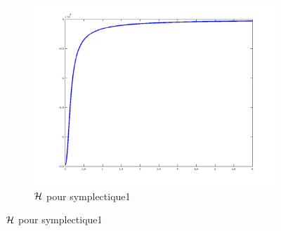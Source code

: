 \begin{figure}
\begin{subfigure}[b]{0.3\textwidth}
    \includegraphics[width=\textwidth]{images/Q2_symplectique1_H.png}
    \caption{$\mathcal{H}$ pour symplectique1}
    \label{fig:q2_symplectique1_H}
  \end{subfigure}


\end{figure}
